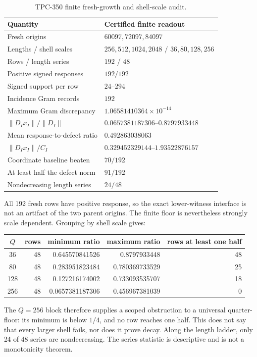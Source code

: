 \documentclass[10pt]{article}
\begin{document}
\begin{table}[t]
\centering
\small
\caption{TPC-350 finite fresh-growth and shell-scale audit.}
\label{tab:summary}
\begin{tabular}{@{}ll@{}}
\toprule
Quantity & Certified finite readout\\
\midrule
Fresh origins & $60097,72097,84097$\\
Lengths / shell scales & $256,512,1024,2048$ / $36,80,128,256$\\
Rows / length series & $192$ / $48$\\
Positive signed responses & $192/192$\\
Signed support per row & $24$--$294$\\
Incidence Gram records & $192$\\
Maximum Gram discrepancy & $1.06581410364\times10^{-14}$\\
$\|D_Ix_I\|/\|D_I\|$ & $0.0657381187306$--$0.8797933448$\\
Mean response-to-defect ratio & $0.492863038063$\\
$\|D_Ix_I\|/C_I$ & $0.329452329144$--$1.93522876157$\\
Coordinate baseline beaten & $70/192$\\
At least half the defect norm & $91/192$\\
Nondecreasing length series & $24/48$\\
\bottomrule
\end{tabular}
\end{table}

All 192 fresh rows have positive response, so the exact lower-witness
interface is not an artifact of the two parent origins.  The finite floor is
nevertheless strongly scale dependent.  Grouping by shell scale gives:
\begin{center}
\begin{tabular}{@{}c r r r r@{}}
\toprule
$Q$ & rows & minimum ratio & maximum ratio & rows at least one half\\
\midrule
36  & 48 & 0.645570841526 & 0.8797933448 & 48\\
80  & 48 & 0.283951823484 & 0.780369733529 & 25\\
128 & 48 & 0.127216174002 & 0.733093535707 & 18\\
256 & 48 & 0.0657381187306 & 0.456967381039 & 0\\
\bottomrule
\end{tabular}
\end{center}

The $Q=256$ block therefore supplies a scoped obstruction to a universal
quarter-floor: its minimum is below $1/4$, and no row reaches one half.  This
does not say that every larger shell fails, nor does it prove decay.  Along
the length ladder, only 24 of 48 series are nondecreasing.  The series statistic
is descriptive and is not a monotonicity theorem.
\end{document}
